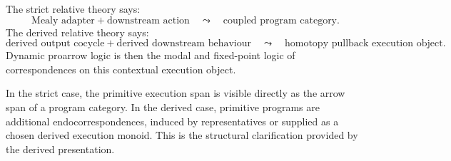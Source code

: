\begin{remark}
\label{rem:derived-relative-final-summary}
The strict relative theory says:
\[
\text{Mealy adapter}
+
\text{downstream action}
\quad\leadsto\quad
\text{coupled program category}.
\]
The derived relative theory says:
\[
\text{derived output cocycle}
+
\text{derived downstream behaviour}
\quad\leadsto\quad
\text{homotopy pullback execution object}.
\]
Dynamic proarrow logic is then the modal and fixed-point logic of
correspondences on this contextual execution object.

In the strict case, the primitive execution span is visible directly as the
arrow span of a program category. In the derived case, primitive programs are
additional endocorrespondences, induced by representatives or supplied as a
chosen derived execution monoid. This is the structural clarification provided
by the derived presentation.
\end{remark}